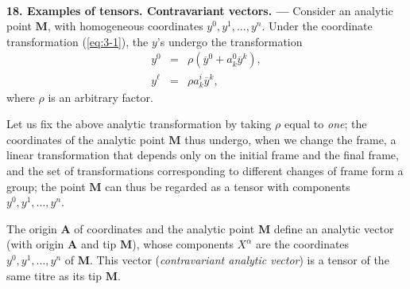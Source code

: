 
\ \\

{\bf 18. Examples of tensors. Contravariant vectors. --- }
% 
Consider an analytic point $\bm M$, with homogeneous coordinates $y^0, y^1, ..., y^n$. Under the coordinate transformation (\ref{eq:3-1}), the $y$'s undergo the transformation
\begin{eqnarray*}
y^0 &=& \rho (\overline y^0 + a^0_k \overline y^k ), \\
y^\ell &=& \rho a^i_k \overline y^k ,
\end{eqnarray*}
where $\rho$ is an arbitrary factor.

Let us fix the above analytic transformation by taking $\rho$ equal to {\em one}; the coordinates of the analytic point $\bm M$ thus undergo, when we change the frame, a linear transformation that depends only on the initial frame and the final frame, and the set of transformations corresponding to different changes of frame form a group; the point $\bm M$ can thus be regarded as a tensor with components $y^0, y^1, ..., y^n$.

The origin $\bm A$ of coordinates and the analytic point $\bm M$ define an analytic vector (with origin $\bm A$ and tip $\bm M$), whose components $X^\alpha$ are the coordinates $y^0, y^1, ..., y^n$ of $\bm M$. This vector ({\em contravariant analytic vector}) is a tensor of the same titre as its tip $\bm M$.

